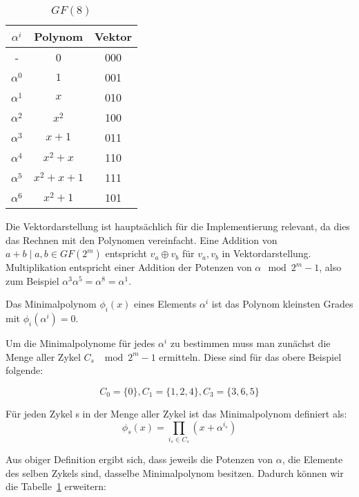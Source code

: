 \begin{table}[!h]
\begin{center}
\begin{tabular}{c|c|c}
$\alpha^i$ & Polynom & Vektor \\
\hline
- & 0 & 000 \\
$\alpha^0$ & $1$ & 001 \\
$\alpha^1$ & $x$ & 010 \\
$\alpha^2$ & $x^2$ & 100 \\
$\alpha^3$ & $x+1$ & 011 \\
$\alpha^4$ & $x^2+x$ & 110 \\
$\alpha^5$ & $x^2+x+1$ & 111 \\
$\alpha^6$ & $x^2+1$ & 101 \\
\end{tabular}
\caption{$GF(8)$}
\label{table:gf}
\end{center}
\end{table}




Die Vektordarstellung ist hauptsächlich für die Implementierung relevant, da dies das Rechnen mit den Polynomen vereinfacht. Eine Addition von $a+b \mid a,b \in GF(2^m)$ entspricht $v_a \oplus v_b$ für $v_a,v_b$ in Vektordarstellung. Multiplikation entspricht einer Addition der Potenzen von $\alpha \mod 2^m-1$, also zum Beispiel $\alpha^3\alpha^5 = \alpha^8 = \alpha^1$.\cite[Kap. 3.2.1]{morelos2006art}

\begin{t_def}
Das Minimalpolynom $\phi_i(x)$ eines Elements $\alpha^i$ ist das Polynom kleinsten Grades mit $\phi_i(\alpha^i) = 0$.\cite[Kap 3.2.1]{morelos2006art}
\end{t_def}

Um die Minimalpolynome für jedes $\alpha^i$ zu bestimmen muss man zunächst die Menge aller Zykel $C_s$ $\mod 2^m-1$ ermitteln. Diese sind für das obere Beispiel folgende:

\begin{center}
$$C_0 = \{0\}, C_1 = \{1,2,4\}, C_3 = \{3,6,5\}$$
\end{center}

\begin{t_def}
\label{def:minimal}
Für jeden Zykel s in der Menge aller Zykel ist das Minimalpolynom definiert als: $$\phi_s(x) = \prod_{i_s \in C_s}(x+\alpha^{i_s})$$\cite[Kap. 3.2.1]{morelos2006art}
\end{t_def}

Aus obiger Definition ergibt sich, dass jeweils die Potenzen von $\alpha$, die Elemente des selben Zykels sind, dasselbe Minimalpolynom besitzen. Dadurch können wir die Tabelle~\ref{table:gf} erweitern:

